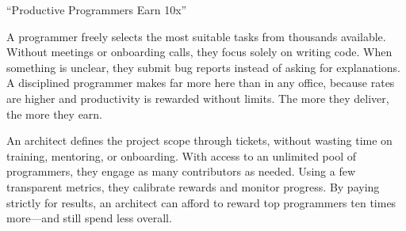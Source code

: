 \documentclass{article}
\newcommand\slide[1]{%
  \pagebreak\topskip0pt\vspace*{\fill}%
  \begin{center}\LARGE%
  #1
  \end{center}%
  \vspace*{\fill}}
\begin{document}
\slide{
  \par
  {\Huge \enquote{Productive Programmers Earn 10x}\par}
  \vspace{1em}
  {\intro\begin{multicols}{2}
  A programmer freely selects the most suitable tasks from thousands available.
  Without meetings or onboarding calls, they focus solely on writing code.
  When something is unclear, they submit bug reports instead of asking for explanations.
  A disciplined programmer makes far more here than in any office, because rates are higher and productivity is rewarded without limits.
  The more they deliver, the more they earn.
  \par\columnbreak\par
  An architect defines the project scope through tickets, without wasting time on training, mentoring, or onboarding.
  With access to an unlimited pool of programmers, they engage as many contributors as needed.
  Using a few transparent metrics, they calibrate rewards and monitor progress.
  By paying strictly for results, an architect can afford to reward top programmers ten times more---and still spend less overall.
  \end{multicols}\par}}
\end{document}
